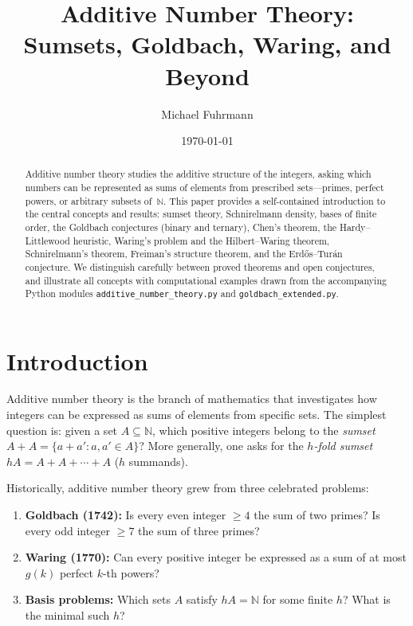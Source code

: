 \documentclass[12pt,a4paper]{amsart}
\title{Additive Number Theory:\\
Sumsets, Goldbach, Waring, and Beyond}
\author{Michael Fuhrmann}
\date{\today}
\theoremstyle{definition}
\newcommand{\N}{\mathbb{N}}
\begin{document}
\begin{abstract}
Additive number theory studies the additive structure of the integers,
asking which numbers can be represented as sums of elements from
prescribed sets---primes, perfect powers, or arbitrary subsets of~$\N$.
This paper provides a self-contained introduction to the central concepts
and results: sumset theory, Schnirelmann density, bases of finite order,
the Goldbach conjectures (binary and ternary), Chen's theorem, the
Hardy--Littlewood heuristic, Waring's problem and the Hilbert--Waring
theorem, Schnirelmann's theorem, Freiman's structure theorem, and the
Erd\H{o}s--Tur\'{a}n conjecture.  We distinguish carefully between
proved theorems and open conjectures, and illustrate all concepts with
computational examples drawn from the accompanying Python modules
\texttt{additive\_number\_theory.py} and \texttt{goldbach\_extended.py}.
\end{abstract}

\maketitle
\tableofcontents

\section{Introduction}\label{sec:intro}

Additive number theory is the branch of mathematics that investigates
how integers can be expressed as sums of elements from specific sets.
The simplest question is: given a set $A \subseteq \N$, which positive
integers belong to the \emph{sumset} $A + A = \{a + a' : a, a' \in A\}$?
More generally, one asks for the \emph{$h$-fold sumset}
$hA = A + A + \cdots + A$ ($h$ summands).

Historically, additive number theory grew from three celebrated problems:

\begin{enumerate}[label=(\arabic*)]
\item \textbf{Goldbach (1742):} Is every even integer $\geq 4$ the sum
      of two primes?  Is every odd integer $\geq 7$ the sum of three primes?
\item \textbf{Waring (1770):} Can every positive integer be expressed as
      a sum of at most $g(k)$ perfect $k$-th powers?
\item \textbf{Basis problems:} Which sets $A$ satisfy $hA = \N$ for
      some finite $h$?  What is the minimal such $h$?
\end{enumerate}
\end{document}
